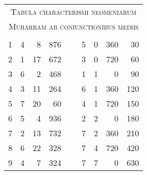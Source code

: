 %
\begin{tabnums} %
\normalsize
\centering
%
\newcommand{\hsa}[1]{\footnotesize{#1}}
\newcommand{\hsb}[1]{\scriptsize{#1}}
%
\newcommand{\hdrB}{%
  \ch{888}{\hsb{Feria}} &
  \hsb{\ch{Horae}{Horae}} &
  \ch{8888}{\hsb{Scrup. 1080}}
}
%
\newcommand{\hdrs}{%
 \ch{88888}{\hsb{Anni expansi}}& \hdrB &
  \hspace*{1.9em} &
 \hdrB & \ch{88888}{\hsb{Anni collecti}}\\
 \cmidrule{1-4} \cmidrule{6-9}
}
%
\begin{tabular}[c]{@{} rrrr c rrrr @{}}
\toprule
\multicolumn{9}{c}{\Large\textsc{Tabula characterismi neomeniarum}} \\
\multicolumn{9}{c}{\large\textsc{Muharram ab coniunctionibus mediis}} \\
\toprule
\hdrs %
  1 &  4 &   8 &  876 &~&  5 &  0 & 360 &   30 \\
  2 &  1 &  17 &  672 &~&  3 &  0 & 720 &   60 \\
  3 &  6 &   2 &  468 &~&  1 &  1 &   0 &   90 \\
  4 &  3 &  11 &  264 &~&  6 &  1 & 360 &  120 \\
  5 &  7 &  20 &   60 &~&  4 &  1 & 720 &  150 \\
  6 &  5 &   4 &  936 &~&  2 &  2 &   0 &  180 \\
  7 &  2 &  13 &  732 &~&  7 &  2 & 360 &  210 \\
  8 &  6 &  22 &  328 &~&  7 &  4 & 720 &  420 \\
  9 &  4 &   7 &  324 &~&  7 &  7 &   0 &  630 \\

\end{tabular}
\end{tabnums}
